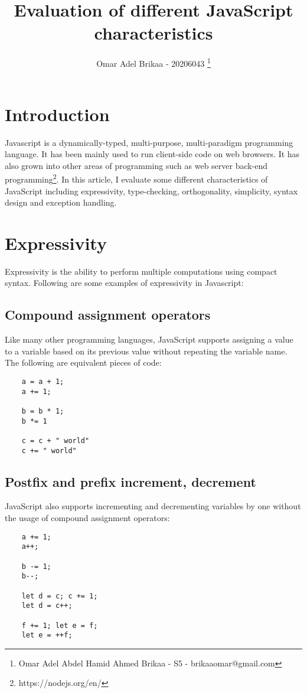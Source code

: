 \documentclass[11pt,a4paper]{article}
\begin{document}
\title{Evaluation of different JavaScript characteristics}
\author{Omar Adel Brikaa - 20206043 \thanks{Omar Adel Abdel Hamid Ahmed Brikaa - S5 - brikaaomar@gmail.com}}
\date{}
\maketitle

\tableofcontents

\section{Introduction}
Javascript is a dynamically-typed, multi-purpose, multi-paradigm programming language.
It has been mainly used to run client-side code on web browsers.
It has also grown into other areas of programming such as web server back-end programming\footnote{https://nodejs.org/en/}.
In this article, I evaluate some different characteristics of JavaScript including
expressivity, type-checking, orthogonality, simplicity, syntax design and exception handling.

\section{Expressivity}
Expressivity is the ability to perform multiple computations using compact syntax. Following are some examples
of expressivity in Javascript:

\subsection{Compound assignment operators}
Like many other programming languages, JavaScript supports assigning a value to a variable based on its previous value
without repeating the variable name. The following are equivalent pieces of code:
\begin{verbatim}
    a = a + 1;
    a += 1;

    b = b * 1;
    b *= 1

    c = c + " world"
    c += " world"
\end{verbatim}

\subsection{Postfix and prefix increment, decrement}
JavaScript also supports incrementing and decrementing variables by one without the usage of compound assignment
operators:
\begin{verbatim}
    a += 1;
    a++;

    b -= 1;
    b--;

    let d = c; c += 1;
    let d = c++;

    f += 1; let e = f;
    let e = ++f;
\end{verbatim}
\end{document}
